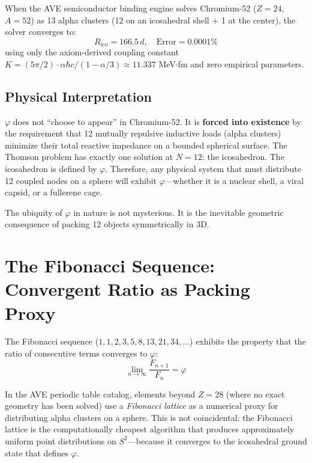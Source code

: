 When the AVE semiconductor binding engine solves Chromium-52 ($Z=24$, $A=52$) as 13 alpha clusters (12 on an icosahedral shell + 1 at the center), the solver converges to:
\begin{equation}
    R_{\text{ico}} = 166.5\,d, \quad \text{Error} = 0.0001\%
\end{equation}
using only the axiom-derived coupling constant $K = (5\pi/2) \cdot \alpha\hbar c / (1 - \alpha/3) \approx 11.337$ MeV$\cdot$fm and zero empirical parameters.

\subsection{Physical Interpretation}
$\varphi$ does not ``choose to appear'' in Chromium-52. It is \textbf{forced into existence} by the requirement that 12 mutually repulsive inductive loads (alpha clusters) minimize their total reactive impedance on a bounded spherical surface. The Thomson problem has exactly one solution at $N=12$: the icosahedron. The icosahedron is defined by $\varphi$. Therefore, any physical system that must distribute 12 coupled nodes on a sphere will exhibit $\varphi$---whether it is a nuclear shell, a viral capsid, or a fullerene cage.

The ubiquity of $\varphi$ in nature is not mysterious. It is the inevitable geometric consequence of packing 12 objects symmetrically in 3D.

\section{The Fibonacci Sequence: Convergent Ratio as Packing Proxy}
\label{sec:fibonacci_packing}

The Fibonacci sequence ($1, 1, 2, 3, 5, 8, 13, 21, 34, \ldots$) exhibits the property that the ratio of consecutive terms converges to $\varphi$:
\begin{equation}
    \lim_{n \to \infty} \frac{F_{n+1}}{F_n} = \varphi
\end{equation}

In the AVE periodic table catalog, elements beyond $Z=28$ (where no exact geometry has been solved) use a \textit{Fibonacci lattice} as a numerical proxy for distributing alpha clusters on a sphere. This is not coincidental: the Fibonacci lattice is the computationally cheapest algorithm that produces approximately uniform point distributions on $S^2$---because it converges to the icosahedral ground state that defines $\varphi$.

